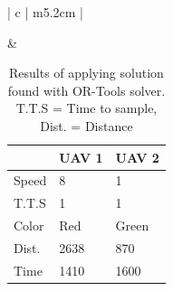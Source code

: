 \begin{table}[h!]
\begin{tabular}{ | c | m{5.2cm} | }
\begin{minipage}[c][53mm][c]{.6\textwidth}
    \end{minipage}
    &
    \small
    \begin{tabular}{m{10mm}|m{11mm} m{11mm}}
        & UAV 1 & UAV 2\\
        \hline
        Speed& 8 & 1 \\
        T.T.S & 1 & 1 \\
        Color & Red & Green \\
        \hline
        Dist.& 2638 & 870 \\
        Time& 1410 & 1600 \\
    \end{tabular}
    \normalsize
    \\
    \hline

  \end{tabular}
  \caption{Results of applying solution found with OR-Tools solver. T.T.S = Time to sample, Dist. = Distance}\label{table:ORToolsResults}
\end{table}
